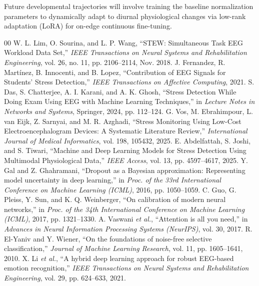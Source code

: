 \documentclass[conference,a4paper]{IEEEtran}
\begin{document}
Future developmental trajectories will involve training the baseline normalization parameters to dynamically adapt to diurnal physiological changes via low-rank adaptation (LoRA) for on-edge continuous fine-tuning.
\begin{thebibliography}{00}
 W. L. Lim, O. Sourina, and L. P. Wang, ``STEW: Simultaneous Task EEG Workload Data Set,'' \textit{IEEE Transactions on Neural Systems and Rehabilitation Engineering}, vol. 26, no. 11, pp. 2106--2114, Nov. 2018.
 J. Fernandez, R. Mart{\'i}nez, B. Innocenti, and B. Lopez, ``Contribution of EEG Signals for Students' Stress Detection,'' \textit{IEEE Transactions on Affective Computing}, 2021.
 S. Das, S. Chatterjee, A. I. Karani, and A. K. Ghosh, ``Stress Detection While Doing Exam Using EEG with Machine Learning Techniques,'' in \textit{Lecture Notes in Networks and Systems}, Springer, 2024, pp. 112--124.
 G. Vos, M. Ebrahimpour, L. van Eijk, Z. Sarnyai, and M. R. Azghadi, ``Stress Monitoring Using Low-Cost Electroencephalogram Devices: A Systematic Literature Review,'' \textit{International Journal of Medical Informatics}, vol. 198, 105432, 2025.
 E. Abdelfattah, S. Joshi, and S. Tiwari, ``Machine and Deep Learning Models for Stress Detection Using Multimodal Physiological Data,'' \textit{IEEE Access}, vol. 13, pp. 4597--4617, 2025.
 Y. Gal and Z. Ghahramani, ``Dropout as a Bayesian approximation: Representing model uncertainty in deep learning,'' in \textit{Proc. of the 33rd International Conference on Machine Learning (ICML)}, 2016, pp. 1050--1059.
 C. Guo, G. Pleiss, Y. Sun, and K. Q. Weinberger, ``On calibration of modern neural networks,'' in \textit{Proc. of the 34th International Conference on Machine Learning (ICML)}, 2017, pp. 1321--1330.
 A. Vaswani \textit{et al.}, ``Attention is all you need,'' in \textit{Advances in Neural Information Processing Systems (NeurIPS)}, vol. 30, 2017.
 R. El-Yaniv and Y. Wiener, ``On the foundations of noise-free selective classification,'' \textit{Journal of Machine Learning Research}, vol. 11, pp. 1605--1641, 2010.
 X. Li \textit{et al.}, ``A hybrid deep learning approach for robust EEG-based emotion recognition,'' \textit{IEEE Transactions on Neural Systems and Rehabilitation Engineering}, vol. 29, pp. 624--633, 2021.
\end{thebibliography}
\end{document}
